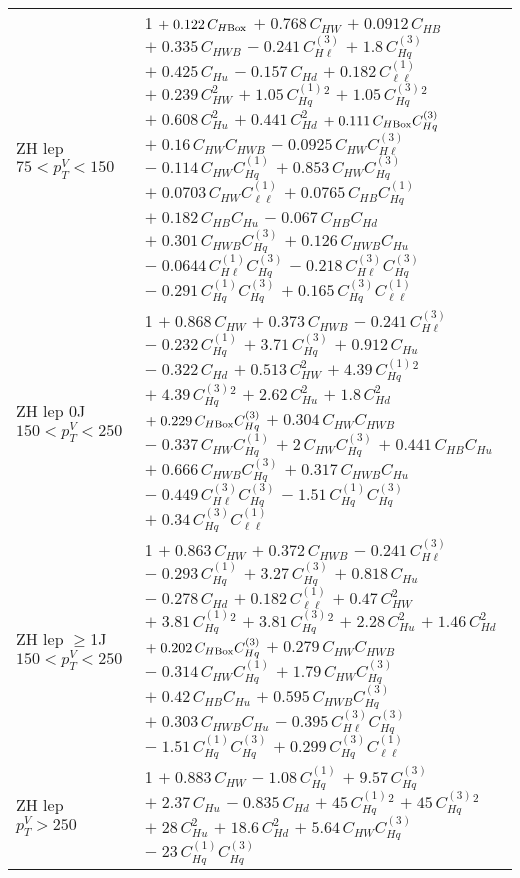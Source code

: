 \begin{tabular}{l|p{}}
    ZH lep $75 < p_{T}^{V} < 150$ & 1 $+\;0.122\,C_{H\rm{Box}}$ $+\;0.768\,C_{HW}$ $+\;0.0912\,C_{HB}$ $+\;0.335\,C_{HWB}$ $-\;0.241\,C^{(3)}_{H\ell}$ $+\;1.8\,C^{(3)}_{Hq}$ $+\;0.425\,C_{Hu}$ $-\;0.157\,C_{Hd}$ $+\;0.182\,C^{(1)}_{\ell\ell}$ $+\;0.239\,C_{HW}^{2}$ $+\;1.05\,C^{(1)}_{Hq}^{2}$ $+\;1.05\,C^{(3)}_{Hq}^{2}$ $+\;0.608\,C_{Hu}^{2}$ $+\;0.441\,C_{Hd}^{2}$ $+\;0.111\,C_{H\rm{Box}}C^{(3)}_{Hq}$ $+\;0.16\,C_{HW}C_{HWB}$ $-\;0.0925\,C_{HW}C^{(3)}_{H\ell}$ $-\;0.114\,C_{HW}C^{(1)}_{Hq}$ $+\;0.853\,C_{HW}C^{(3)}_{Hq}$ $+\;0.0703\,C_{HW}C^{(1)}_{\ell\ell}$ $+\;0.0765\,C_{HB}C^{(1)}_{Hq}$ $+\;0.182\,C_{HB}C_{Hu}$ $-\;0.067\,C_{HB}C_{Hd}$ $+\;0.301\,C_{HWB}C^{(3)}_{Hq}$ $+\;0.126\,C_{HWB}C_{Hu}$ $-\;0.0644\,C^{(1)}_{H\ell}C^{(3)}_{Hq}$ $-\;0.218\,C^{(3)}_{H\ell}C^{(3)}_{Hq}$ $-\;0.291\,C^{(1)}_{Hq}C^{(3)}_{Hq}$ $+\;0.165\,C^{(3)}_{Hq}C^{(1)}_{\ell\ell}$ \\
    ZH lep 0J $150 < p_{T}^{V} < 250$ & 1 $+\;0.868\,C_{HW}$ $+\;0.373\,C_{HWB}$ $-\;0.241\,C^{(3)}_{H\ell}$ $-\;0.232\,C^{(1)}_{Hq}$ $+\;3.71\,C^{(3)}_{Hq}$ $+\;0.912\,C_{Hu}$ $-\;0.322\,C_{Hd}$ $+\;0.513\,C_{HW}^{2}$ $+\;4.39\,C^{(1)}_{Hq}^{2}$ $+\;4.39\,C^{(3)}_{Hq}^{2}$ $+\;2.62\,C_{Hu}^{2}$ $+\;1.8\,C_{Hd}^{2}$ $+\;0.229\,C_{H\rm{Box}}C^{(3)}_{Hq}$ $+\;0.304\,C_{HW}C_{HWB}$ $-\;0.337\,C_{HW}C^{(1)}_{Hq}$ $+\;2\,C_{HW}C^{(3)}_{Hq}$ $+\;0.441\,C_{HB}C_{Hu}$ $+\;0.666\,C_{HWB}C^{(3)}_{Hq}$ $+\;0.317\,C_{HWB}C_{Hu}$ $-\;0.449\,C^{(3)}_{H\ell}C^{(3)}_{Hq}$ $-\;1.51\,C^{(1)}_{Hq}C^{(3)}_{Hq}$ $+\;0.34\,C^{(3)}_{Hq}C^{(1)}_{\ell\ell}$ \\
    ZH lep $\geq$1J $150 < p_{T}^{V} < 250$ & 1 $+\;0.863\,C_{HW}$ $+\;0.372\,C_{HWB}$ $-\;0.241\,C^{(3)}_{H\ell}$ $-\;0.293\,C^{(1)}_{Hq}$ $+\;3.27\,C^{(3)}_{Hq}$ $+\;0.818\,C_{Hu}$ $-\;0.278\,C_{Hd}$ $+\;0.182\,C^{(1)}_{\ell\ell}$ $+\;0.47\,C_{HW}^{2}$ $+\;3.81\,C^{(1)}_{Hq}^{2}$ $+\;3.81\,C^{(3)}_{Hq}^{2}$ $+\;2.28\,C_{Hu}^{2}$ $+\;1.46\,C_{Hd}^{2}$ $+\;0.202\,C_{H\rm{Box}}C^{(3)}_{Hq}$ $+\;0.279\,C_{HW}C_{HWB}$ $-\;0.314\,C_{HW}C^{(1)}_{Hq}$ $+\;1.79\,C_{HW}C^{(3)}_{Hq}$ $+\;0.42\,C_{HB}C_{Hu}$ $+\;0.595\,C_{HWB}C^{(3)}_{Hq}$ $+\;0.303\,C_{HWB}C_{Hu}$ $-\;0.395\,C^{(3)}_{H\ell}C^{(3)}_{Hq}$ $-\;1.51\,C^{(1)}_{Hq}C^{(3)}_{Hq}$ $+\;0.299\,C^{(3)}_{Hq}C^{(1)}_{\ell\ell}$ \\
    ZH lep $p_{T}^{V} > 250$ & 1 $+\;0.883\,C_{HW}$ $-\;1.08\,C^{(1)}_{Hq}$ $+\;9.57\,C^{(3)}_{Hq}$ $+\;2.37\,C_{Hu}$ $-\;0.835\,C_{Hd}$ $+\;45\,C^{(1)}_{Hq}^{2}$ $+\;45\,C^{(3)}_{Hq}^{2}$ $+\;28\,C_{Hu}^{2}$ $+\;18.6\,C_{Hd}^{2}$ $+\;5.64\,C_{HW}C^{(3)}_{Hq}$ $-\;23\,C^{(1)}_{Hq}C^{(3)}_{Hq}$ \\
\end{tabular}